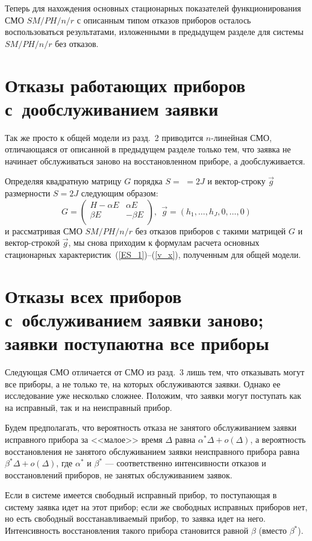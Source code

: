 \begin{multicols}{2}
Теперь для нахождения основных стационарных показателей функционирования
СМО $SM/PH/n/r$ с описанным типом отказов приборов осталось
воспользоваться результатами, изложенными в предыдущем разделе для
системы $SM/PH/n/r$ без отказов.

\section{Отказы работающих приборов с~дообслуживанием заявки}

Так же просто к общей модели из разд.~2 приводится $n$-линейная СМО,
отличающаяся от описанной в предыдущем разделе только тем, что заявка
не начинает обслуживаться заново на восстановленном приборе, а
дообслуживается.


Определяя квадратную матрицу $G$ порядка $S=$ $=2J$ и вектор-строку $\vec g$ 
размерности $S=2J$ сле\-ду\-ющим образом:
$$
G=
\begin{pmatrix}
H-\alpha E     &    \alpha E   \\
\beta E        &    -\beta E   \\
\end{pmatrix},\ \
\vec g =
(h_1,\ldots,h_J,0,\ldots,0)
$$
и рассматривая СМО $SM/PH/n/r$ без отказов приборов с такими
матрицей $G$ и вектор-строкой $\vec g$, мы снова приходим к
формулам расчета основных стационарных
характеристик~(\ref{ES_1})--(\ref{v_x}),
полученным для общей модели.

\section{Отказы всех приборов с~обслуживанием заявки заново;
заявки поступают\newline на все приборы}

Следующая СМО отличается от СМО из разд.~3 лишь тем, что отказывать могут все 
приборы, а не только те, на которых обслуживаются заявки. Однако ее 
исследование уже несколько сложнее. Положим, что заявки могут поступать как на 
исправный, так и на неисправный прибор.

Будем предполагать, что вероятность отказа не занятого обслуживанием
заявки исправного прибора за <<малое>> время $\Delta$ равна
$\alpha^* \Delta + o(\Delta)$,
а вероятность восстановления не занятого обслуживанием заявки
неисправного прибора равна $\beta^* \Delta + o(\Delta)$,
где $\alpha^*$ и $\beta^*$ --- соответственно интенсивности отказов и
восстановлений
приборов, не занятых обслуживанием заявок.

Если в системе имеется свободный исправный прибор, то
поступающая в систему заявка идет на этот прибор; если же свободных
исправных приборов нет, но есть свободный восстанавливаемый прибор, то
заявка идет на него. Интенсивность восстановления такого прибора
становится равной $\beta$ (вместо $\beta^*$).


\end{multicols}

